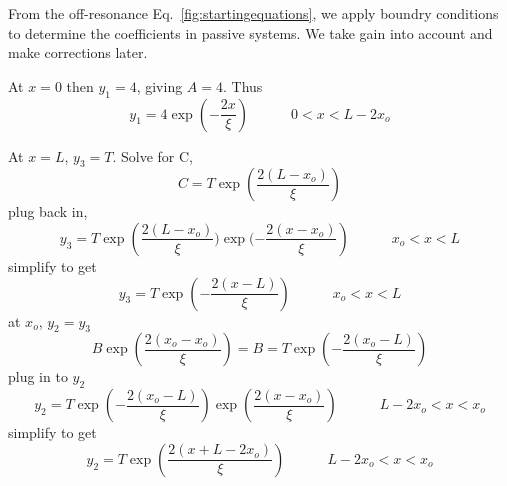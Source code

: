 \begin{comment}
\begin{figure}
\vskip -0.5cm
\centerline{
\scalebox{0.5}{\texttt{[image: pictures/transmission\_derivation\_14\_LR]}}
\scalebox{0.5}{\texttt{[image: pictures/transmission\_derivation\_34\_LR]}}
\scalebox{0.5}{\texttt{[image: pictures/transmission\_derivation\_off\_res\_LR]}}
}
\vskip -0.5cm
\caption{Log of energy versus position sketches for a center of localization in the first half (left), Eq.~\ref{fig:left}; and second half (center), Eq.~\ref{fig:right}. The turning point in the center plot is $L-2 x_o$. The right sketch is off-resonance but prior to pure exponential decay, which applies to any center of localization position, as described by Eq.~\ref{fig:startingequations}. The turning point in the right plot from the initial exponential decay to growth varies depending how far off resonance one is. We call this $x_1$}
\label{fig:cononicaldefectpositions}
\end{figure}
\end{comment}

From the off-resonance Eq.~\ref{fig:startingequations}, we apply boundry conditions to determine the coefficients in passive systems. We take gain into account and make corrections later.

At $x=0$ then $y_1=4$, giving $A=4$. Thus
\begin{equation}
\boxed{y_1 = 4 \exp\left(-\frac{2 x}{\xi}\right)}   \quad \quad \quad 0 < x < L-2 x_o 
\end{equation}

At $x=L$, $y_3=T$. Solve for C,
\begin{equation}
C=T \exp\left(\frac{2(L-x_o)}{\xi}\right)
\end{equation}
plug back in,
\begin{equation}
y_3 = T \exp\left(\frac{2(L-x_o)}{\xi}) \exp(-\frac{2 (x-x_o)}{\xi}\right)  \quad \quad \quad  x_o < x < L
\end{equation}
simplify to get
\begin{equation}
\boxed{y_3 = T \exp\left(-\frac{2(x-L)}{\xi}\right)}  \quad \quad \quad  x_o < x < L
\end{equation}
at $x_o$, $y_2 = y_3$
\begin{equation}
B \exp\left(\frac{2 (x_o-x_o)}{\xi}\right) = B = T \exp\left(-\frac{2(x_o-L)}{\xi}\right)
\end{equation}
plug in to $y_2$
\begin{equation}
y_2 = T \exp\left(-\frac{2(x_o-L)}{\xi}\right) \exp\left(\frac{2 (x-x_o)}{\xi}\right) \quad \quad \quad L-2 x_o < x < x_o 
\end{equation}
simplify to get
\begin{equation}
\boxed{y_2 = T \exp\left(\frac{2(x+L-2 x_o)}{\xi}\right)} \quad \quad \quad L-2 x_o < x < x_o 
\end{equation}

